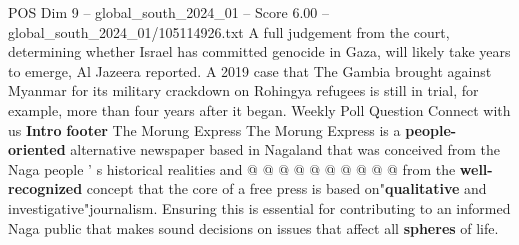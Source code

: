 \begin{textsample}{POS Dim 9 – global\_south\_2024\_01 – Score 6.00 – global\_south\_2024\_01/105114926.txt}
A full judgement from the court, determining whether Israel has committed genocide in Gaza, will likely take years to emerge, Al Jazeera reported.
A 2019 case that The Gambia brought against Myanmar for its military crackdown on Rohingya refugees is still in trial, for example, more than four years after it began.
Weekly Poll Question Connect with us \textbf{Intro} \textbf{footer} The Morung Express The Morung Express is a \textbf{people-oriented} alternative newspaper based in Nagaland that was conceived from the Naga people ' s historical realities and @ @ @ @ @ @ @ @ @ @ from the \textbf{well-recognized} concept that the core of a free press is based on"\textbf{qualitative} and investigative"journalism.
Ensuring this is essential for contributing to an informed Naga public that makes sound decisions on issues that affect all \textbf{spheres} of life.

\end{textsample}
